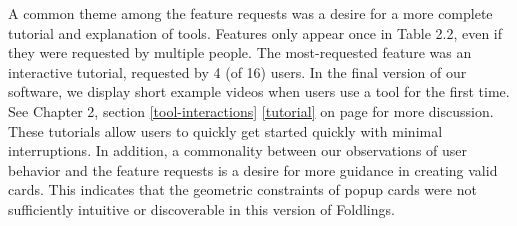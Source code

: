 A common theme among the feature requests was a desire for a more
complete tutorial and explanation of tools. Features only appear once in
Table 2.2, even if they were requested by multiple people. The
most-requested feature was an interactive tutorial, requested by 4 (of
16) users. In the final version of our software, we display short
example videos when users use a tool for the first time. See Chapter 2,
section \ref{tool-interactions} \ref{tutorial}  on
page \pageref{tutorial} for more discussion. These tutorials allow users
to quickly get started quickly with minimal interruptions. In addition,
a commonality between our observations of user behavior and the feature
requests is a desire for more guidance in creating valid cards. This
indicates that the geometric constraints of popup cards were not
sufficiently intuitive or discoverable in this version of Foldlings.

